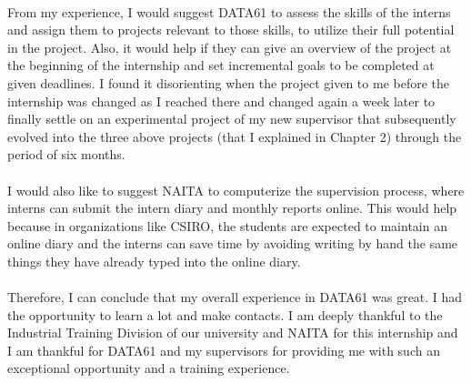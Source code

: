 \paragraph{}
From my experience, I would suggest DATA61 to assess the skills of the interns and assign them to projects relevant to those skills, to utilize their full potential in the project. Also, it would help if they can give an overview of the project at the beginning of the internship and set incremental goals to be completed at given deadlines. I found it disorienting when the project given to me before the internship was changed as I reached there and changed again a week later to finally settle on an experimental project of my new supervisor that subsequently evolved into the three above projects (that I explained in Chapter 2) through the period of six months. 

\paragraph{}
I would also like to suggest NAITA to computerize the supervision process, where interns can submit the intern diary and monthly reports online. This would help because in organizations like CSIRO, the students are expected to maintain an online diary and the interns can save time by avoiding writing by hand the same things they have already typed into the online diary.

\paragraph{}
Therefore, I can conclude that my overall experience in DATA61 was great. I had the opportunity to learn a lot and make contacts. I am deeply thankful to the Industrial Training Division of our university and NAITA for this internship and I am thankful for DATA61 and my supervisors for providing me with such an exceptional opportunity and a training experience.





